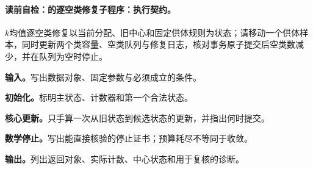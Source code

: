 \begingroup
\addtocounter{algocf}{-1}
\renewcommand{\thealgocf}{\thechapter.\arabic{algocf}B}
\paragraph{读前自检：的逐空类修复子程序：执行契约。}$k$均值逐空类修复以当前分配、旧中心和固定供体规则为状态；请移动一个供体样本，同时更新两个类容量、空类队列与修复日志，核对事务原子提交后空类数减少，并在队列为空时停止。\par
\begin{keypointbox}[title={的逐空类修复子程序：五步阅读}]
\textbf{输入。}写出数据对象、固定参数与必须成立的条件。\par
\textbf{初始化。}标明主状态、计数器和第一个合法状态。\par
\textbf{核心更新。}只手算一次从旧状态到候选状态的更新，并指出何时提交。\par
\textbf{数学停止。}写出能直接核验的停止证书；预算耗尽不等同于收敛。\par
\textbf{输出。}列出返回对象、实际计数、中心状态和用于复核的诊断。
\end{keypointbox}

